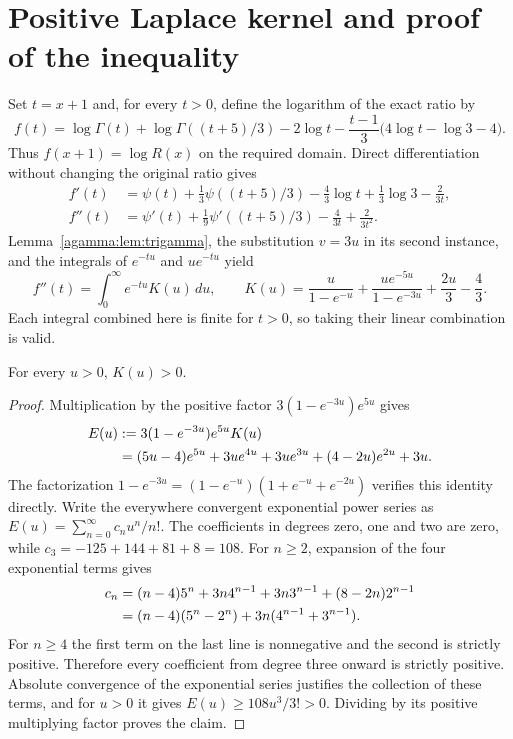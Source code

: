 \documentclass[11pt]{article}
\begin{document}
\section{Positive Laplace kernel and proof of the inequality}
\label{agamma:sec:kernel}
Set $t=x+1$ and, for every $t>0$, define the logarithm of the exact
ratio by
\begin{equation}\label{agamma:eq:f}
f(t)=\log\Gamma(t)+\log\Gamma((t+5)/3)-2\log t
-\frac{t-1}{3}\bigl(4\log t-\log3-4\bigr).
\end{equation}
Thus $f(x+1)=\log R(x)$ on the required domain. Direct differentiation
without changing the original ratio gives
\begin{align}
f'(t)&=\psi(t)+\tfrac13\psi((t+5)/3)
-\tfrac43\log t+\tfrac13\log3-\tfrac2{3t},\label{agamma:eq:fp}\\
f''(t)&=\psi'(t)+\tfrac19\psi'((t+5)/3)
-\tfrac4{3t}+\tfrac2{3t^2}.\label{agamma:eq:fpp}
\end{align}
Lemma~\ref{agamma:lem:trigamma}, the substitution $v=3u$ in its second
instance, and the integrals of $e^{-tu}$ and $u e^{-tu}$ yield
\begin{equation}\label{agamma:eq:kernel}
f''(t)=\int_0^\infty e^{-tu}K(u)\,du,\qquad
K(u)=\frac{u}{1-e^{-u}}+
\frac{u e^{-5u}}{1-e^{-3u}}+\frac{2u}{3}-\frac43.
\end{equation}
Each integral combined here is finite for $t>0$, so taking their
linear combination is valid.

\begin{agammalemma}\label{agamma:lem:kernel-positive}
For every $u>0$, $K(u)>0$.
\end{agammalemma}
\begin{proof}
Multiplication by the positive factor $3(1-e^{-3u})e^{5u}$ gives
\begin{align}
E(u)&:=3(1-e^{-3u})e^{5u}K(u)\notag\\
&=(5u-4)e^{5u}+3u e^{4u}+3u e^{3u}
+(4-2u)e^{2u}+3u.\label{agamma:eq:E}
\end{align}
The factorization $1-e^{-3u}=(1-e^{-u})(1+e^{-u}+e^{-2u})$
verifies this identity directly. Write the everywhere convergent
exponential power series as $E(u)=\sum_{n=0}^\infty c_nu^n/n!$.
The coefficients in degrees zero, one and two are zero, while
$c_3=-125+144+81+8=108$. For $n\ge2$, expansion of the four
exponential terms gives
\begin{align}
c_n&=(n-4)5^n+3n4^{n-1}+3n3^{n-1}
+(8-2n)2^{n-1}\notag\\
&=(n-4)(5^n-2^n)+3n(4^{n-1}+3^{n-1}).\label{agamma:eq:coefficients}
\end{align}
For $n\ge4$ the first term on the last line is nonnegative and
the second is strictly positive. Therefore every coefficient from
degree three onward is strictly positive. Absolute convergence of
the exponential series justifies the collection of these terms,
and for $u>0$ it gives $E(u)\ge108u^3/3!>0$.
Dividing by its positive multiplying factor proves the claim.
\end{proof}
\end{document}
